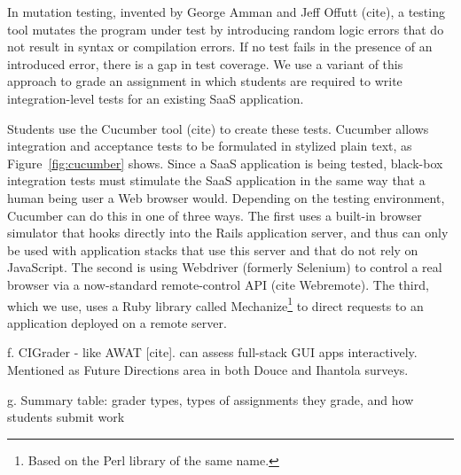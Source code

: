 In mutation testing, invented by George Amman and Jeff Offutt (cite), a
testing tool mutates the program under test by introducing random logic
errors that do not result in syntax or compilation errors.  If no test fails
in the presence of an introduced error, there is a gap in test
coverage.  We use a variant of this approach to grade an
assignment in which students are required to write integration-level
tests for an existing SaaS application.

Students use the Cucumber tool (cite) to create these tests.
Cucumber allows integration and acceptance tests to be formulated in
stylized plain text, as Figure~\ref{fig:cucumber} shows.
Since a SaaS application is being tested, black-box integration tests
must stimulate the SaaS application in the same way that
a human being user a Web browser would.
Depending on the testing environment, Cucumber can do this in one of
three ways.  The first uses a built-in browser simulator that hooks
directly into 
the Rails application server, and thus can only be used
with application stacks that use this server and that do not rely on
JavaScript.  The second is using Webdriver (formerly 
Selenium) to control a real browser via a now-standard remote-control
API (cite Webremote).  The third, which we use, uses a Ruby library called
Mechanize\footnote{Based on the Perl library of the same name.} to
direct requests to an application deployed on  a remote server.  


f.	CIGrader - like AWAT [cite]. can assess full-stack GUI apps interactively. Mentioned as Future  Directions area in both Douce and Ihantola surveys.

g.	Summary table: grader types, types of assignments they grade, and how students submit work



